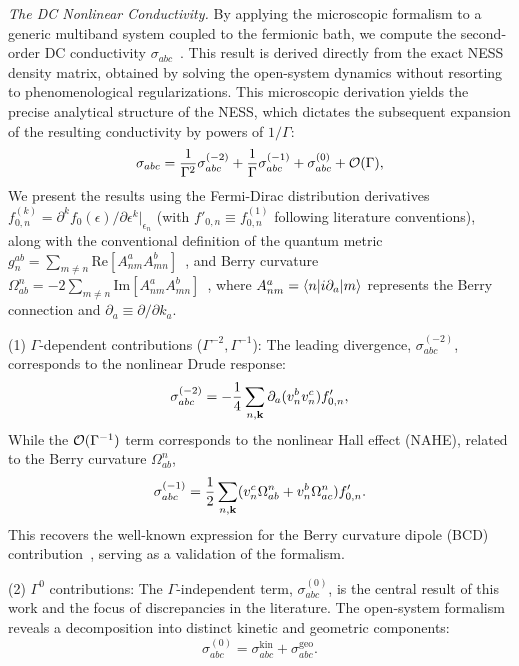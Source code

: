 \documentclass[twocolumn, prx, reprint, amsfonts, amsmath, amssymb, longbibliography, floatfix, aps]{revtex4-2}
\begin{document}
\textit{\color{blue}The DC Nonlinear Conductivity.} By applying the microscopic formalism to a generic multiband system coupled to the fermionic bath, we compute the second-order DC conductivity $\sigma_{abc}$~\cite{supplemental}.
This result is derived directly from the exact NESS density matrix, obtained by solving the open-system dynamics without resorting to phenomenological regularizations. 
This microscopic derivation yields the precise analytical structure of the NESS, which dictates the subsequent expansion of the resulting conductivity by powers of $1/\Gamma$:
\begin{align}
\begin{aligned}
\sigma_{abc} = \frac{1}{\Gamma^2}\sigma_{abc}^{(-2)} + \frac{1}{\Gamma}\sigma_{abc}^{(-1)} +
\sigma_{abc}^{(0)} + {\cal O}(\Gamma),
\end{aligned}
\end{align}
We present the results using the Fermi-Dirac distribution derivatives $f_{0,n}^{(k)} = \partial^k f_{0} (\epsilon)/\partial \epsilon^k|_{\epsilon_n}$ (with $f'_{0, n} \equiv f^{(1)}_{0, n}$ following literature conventions), along with the conventional definition of the quantum metric $g_n^{ab} = \sum_{m\neq n}\text{Re}[A_{nm}^a A_{mn}^b]$~\cite{QGT_Provost_1980, QGT_PATI_1991}, and Berry curvature $\Omega^n_{ab} = -2\sum_{m\neq n}\text{Im}[A_{nm}^a A_{mn}^b]$~\cite{berry1984quantal, thouless1982quantized}, where $A^{a}_{nm} = \braket{n|i\partial_{a}|m}$ represents the Berry connection and $\partial_{a} \equiv \partial/\partial k_{a}$.

(1) $\Gamma$-dependent contributions ($\Gamma^{-2}, \Gamma^{-1}$): The leading divergence, $\sigma_{abc}^{(-2)}$, corresponds to the nonlinear Drude response:
\begin{equation}
\sigma_{abc}^{(-2)} = -\frac{1}{4} \sum_{n,{\bf k}} \partial_a(v_n^b v_n^c) f_{0,n}', 
\label{eq:sigma_neg2}
\end{equation}
While the ${\cal O}(\Gamma^{-1})$ term corresponds to the nonlinear Hall effect (NAHE), related to the Berry curvature $\Omega^n_{ab}$,
\begin{equation}
\sigma_{abc}^{(-1)} = \frac{1}{2} \sum_{n,{\bf k}} (v_n^c \Omega_{ab}^n + v_n^b \Omega_{ac}^n) f_{0,n}'.
\label{eq:sigma_neg1}
\end{equation}
This recovers the well-known expression for the Berry curvature dipole (BCD) contribution~\cite{sodemann2015quantum,ma2019observation,shi2023berry}, serving as a validation of the formalism.

(2) $\Gamma^0$ contributions: The $\Gamma$-independent term, $\sigma_{abc}^{(0)}$, is the central result of this work and the focus of discrepancies in the literature. 
The open-system formalism reveals a decomposition into distinct kinetic and geometric components: 
\begin{equation}
\sigma_{abc}^{(0)} = \sigma_{abc}^{\text{kin}} + \sigma_{abc}^{\text{geo}} .
\end{equation}
\end{document}
